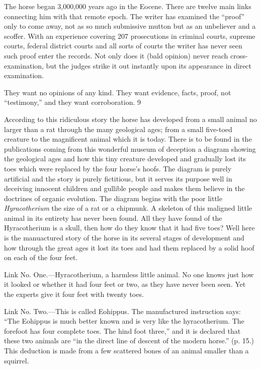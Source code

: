 The horse began 3,000,000 years ago in the Eocene. There are twelve main links connecting
him with that remote epoch. The writer has examined the ``proof'' only to come away, not as
so much submissive mutton but as an unbeliever and a scoffer. With an experience covering
207 prosecutions in criminal courts, supreme courts, federal district courts and all sorts of
courts the writer has never seen such proof enter the records. Not only does it (bald opinion)
never reach cross-examination, but the judges strike it out instantly upon its appearance in
direct examination.

They want no opinions of any kind. They want evidence, facts, proof, not ``testimony,'' and
they want corroboration. 9

According to this ridiculous story the horse has developed from a small animal no larger than
a rat through the many geological ages; from a small five-toed creature to the magnificent
animal which it is today. There is to be found in the publications coming from this wonderful
museum of deception a diagram showing the geological ages and how this tiny creature
developed and gradually lost its toes which were replaced by the four horse's hoofs. The
diagram is purely artificial and the story is purely fictitious, but it serves its purpose well in
deceiving innocent children and gullible people and makes them believe in the doctrines of
organic evolution. The diagram begins with the poor little \textit{Hyracotherium} the size of a rat or
a chipmunk. A skeleton of this maligned little animal in its entirety has never been found. All
they have found of the Hyracotherium is a skull, then how do they know that it had five toes?
Well here is the manuactured story of the horse in its several stages of development and how
through the great ages it lost its toes and had them replaced by a solid hoof on each of the
four feet.

Link No. One.—Hyracotherium, a harmless little animal. No one knows just how it looked or
whether it had four feet or two, as they have never been seen. Yet the experts give it four feet
with twenty toes.

Link No. Two.—This is called Eohippus. The manufactured instruction says: ``The Eohippus
is much better known and is very like the hyracotherium. The forefoot has four complete
toes. The hind foot three,'' and it is declared that these two animals are ``in the direct line of
descent of the modern horse.'' (p. 15.) This deduction is made from a few scattered bones of
an animal smaller than a squirrel.

